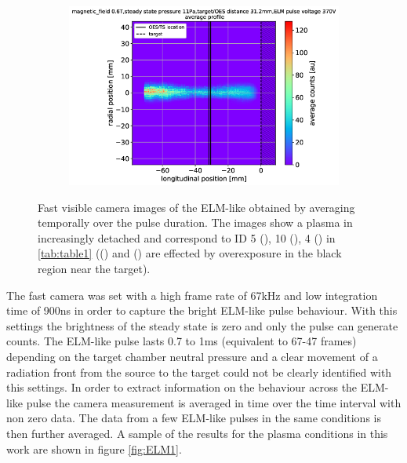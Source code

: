 \begin{figure}
\begin{subfigure}{0.31\textwidth}
         \vspace*{-17mm}
         {\color{white}\caption{\phantom{wewwwww}}\label{fig:ELMb}}
     \end{subfigure}
     \hfill
     \begin{subfigure}{0.31\textwidth}
         \centering
         \vspace*{-0mm}
         \includegraphics[width=\textwidth,trim={34 0 8 8},clip]{Chapters/chapter3/figs/fast_camera_merge_97_average3.png}
         \vspace*{-17mm}
         {\color{white}\caption{\phantom{wewwwww}}\label{fig:ELMc}}
     \end{subfigure}
        \vspace*{+6mm}
        \caption{Fast visible camera images of the ELM-like obtained by averaging temporally over the pulse duration. The images show a plasma in increasingly detached and correspond to ID 5 (), 10 (), 4 () in \autoref{tab:table1} (() and () are effected by overexposure in the black region near the target).}
        \label{fig:ELM1}
\end{figure}

The fast camera was set with a high frame rate of 67kHz and low integration time of 900ns in order to capture the bright ELM-like pulse behaviour. With this settings the brightness of the steady state is zero and only the pulse can generate counts. The ELM-like pulse lasts 0.7 to 1ms (equivalent to 67-47 frames) depending on the target chamber neutral pressure and a clear movement of a radiation front from the source to the target could not be clearly identified with this settings. In order to extract information on the behaviour across the ELM-like pulse the camera measurement is averaged in time over the time interval with non zero data. The data from a few ELM-like pulses in the same conditions is then further averaged. A sample of the results for the plasma conditions in this work are shown in figure \autoref{fig:ELM1}.

